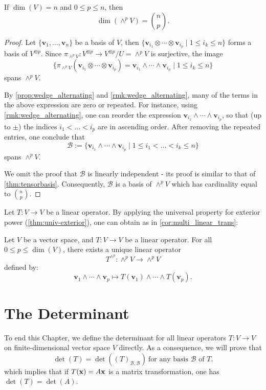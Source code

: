\begin{proposition}
If $\dim(V) = n$ and $0 \leq p \leq n$, then
\[
\dim(\wedge^p V) = \binom{n}{p}.
\]
\end{proposition}
\begin{proof} 
Let $\{\mathbf{v}_1, \dots, \mathbf{v}_n\}$ be a basis of $V$, then $\{ \mathbf{v}_{i_1} \otimes \cdots \otimes \mathbf{v}_{i_p} \mid 1 \leq i_k \leq n\}$ forms a basis of $V^{\otimes p}$. Since $\pi_{\wedge^p V} : V^{\otimes p} \to V^{\otimes p}/U = \wedge^p V$ is surjective, the image 
\[ 
\{ \pi_{\wedge^pV}(\mathbf{v}_{i_1} \otimes \cdots \otimes \mathbf{v}_{i_p}) = \mathbf{v}_{i_1} \wedge \cdots \wedge \mathbf{v}_{i_p} \mid 1 \leq i_k\leq n \}
\]
spans $\wedge^p V$.
    
By \autoref{prop:wedge_alternating} and \autoref{rmk:wedge_alternating}, many of the terms in the above expression are zero or repeated. For instance, using \autoref{rmk:wedge_alternating}, one can reorder the expression $\mathbf{v}_{i_1} \wedge \cdots \wedge \mathbf{v}_{i_p}$, so that (up to $\pm$) the indices
$i_1 < \dots < i_p$ are in ascending order. 
After removing the repeated entries, one conclude that
$$\mathcal{B} := \{ \mathbf{v}_{i_1} \wedge \cdots \wedge \mathbf{v}_{i_p} \mid 1 \leq i_1 < \dots < i_k \leq n\}$$
spans $\wedge^pV.$

We omit the proof that $\mathcal{B}$ is linearly independent - its proof is similar to that of \autoref{thm:tensorbasis}. Consequently, $\mathcal{B}$ is a basis of $\wedge^pV$ which has cardinality equal to $\binom{n}{p}$.
\end{proof}

Let $T: V \to V$ be a linear operator. By applying the universal property for exterior power (\autoref{thm:univ-exterior}), one can obtain as in \autoref{cor:multi_linear_trans}:
\begin{corollary} \label{cor:exterior_transformation}
Let $V$ be a vector space, and $T:V \to V$ be a linear operator. For all $0 \leq p \leq \dim(V)$, there exists a unique linear operator
  \[
  T^{\wedge^p} : \wedge^p V \to \wedge^p V
  \]
defined by:
  \[
  \mathbf{v}_1 \wedge \cdots \wedge \mathbf{v}_p \mapsto T(\mathbf{v}_1) \wedge \cdots \wedge T(\mathbf{v}_p).
  \]
\end{corollary}



\section{The Determinant}
To end this Chapter, we define the determinant for all linear operators $T:V \to V$ on finite-dimensional vector space $V$ directly. As a consequence, we will prove that
\[
\det(T) = \det \left( (T)_{\mathcal{B}, \mathcal{B}} \right) \ \text{for any basis } \mathcal{B} \text{ of } T.
\]
which implies that if $T({\bf x}) = A{\bf x}$ is a matrix transformation, one has $\det(T) = \det(A)$.

